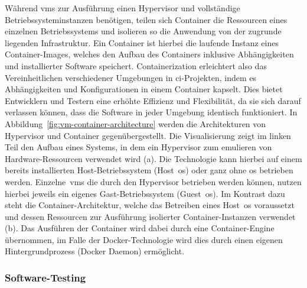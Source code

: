 Während \acrshort{vm}s zur Ausführung einen Hypervisor und vollständige Betriebssysteminstanzen benötigen, teilen sich
Container die Ressourcen eines einzelnen Betriebssystems und isolieren so die Anwendung von der zugrunde liegenden
Infrastruktur.
Ein Container ist hierbei die laufende Instanz eines Container-Images, welches den Aufbau des Containers inklusive
Abhängigkeiten und installierter Software speichert.
Containerization erleichtert also das Vereinheitlichen verschiedener Umgebungen in \acrshort{ci}-Projekten, indem es
Abhängigkeiten und Konfigurationen in einem Container kapselt.
Dies bietet Entwicklern und Testern eine erhöhte Effizienz und Flexibilität, da sie sich darauf verlassen können, dass
die Software in jeder Umgebung identisch funktioniert.
In Abbildung\ \ref{fig:vm-container-architecture} werden die Architekturen von Hypervisor und Container
gegenübergestellt.
Die Visualisierung zeigt im linken Teil den Aufbau eines Systems, in dem ein Hypervisor zum emulieren von
Hardware-Ressourcen verwendet wird (a).
Die Technologie kann hierbei auf einem bereits installierten Host-Betriebssystem (Host\ \acrshort{os}) oder ganz ohne
\acrshort{os} betrieben werden.
Einzelne\ \acrshort{vm}s die durch den Hypervisor betrieben werden können, nutzen hierbei jeweils ein eigenes
Gast-Betriebssystem (Guest\ \acrshort{os}).
Im Kontrast dazu steht die Container-Architektur, welche das Betreiben eines Host\ \acrshort{os} voraussetzt und
dessen Ressourcen zur Ausführung isolierter Container-Instanzen verwendet (b).
Das Ausführen der Container wird dabei durch eine Container-Engine übernommen, im Falle der Docker-Technologie wird
dies durch einen eigenen Hintergrundprozess (Docker Daemon) ermöglicht.

\subsubsection{Software-Testing}

